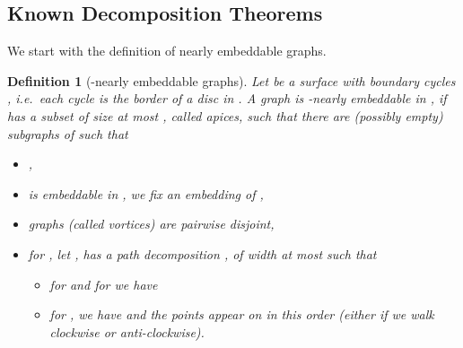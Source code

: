 \documentclass[11pt]{article}
\newtheorem{definition}{Definition}
\begin{document}
\subsection{Known Decomposition Theorems} We start with the definition of nearly embeddable graphs. 
\begin{definition}[-nearly embeddable graphs]
Let  be a surface with boundary cycles , i.e.\ each cycle
 is the border of a disc in . A graph  is
{\em -nearly embeddable} in , if  has a subset  of size at most ,
called {\em apices}, such that there are (possibly empty) subgraphs
 of  such that
\begin{itemize}
\setlength{\itemsep}{-2pt}
\item ,
\item  is embeddable in , we fix an embedding of ,
\item graphs  (called \emph{vortices}) are pairwise disjoint,
\item for , let ,   has a path decomposition 
, of width at most  such that

\begin{itemize}
\item for  and for  we have 
\item for , we have  and the points  appear on  in this order (either if we walk clockwise or anti-clockwise).
\end{itemize}
\end{itemize}
\end{definition}
\end{document}
